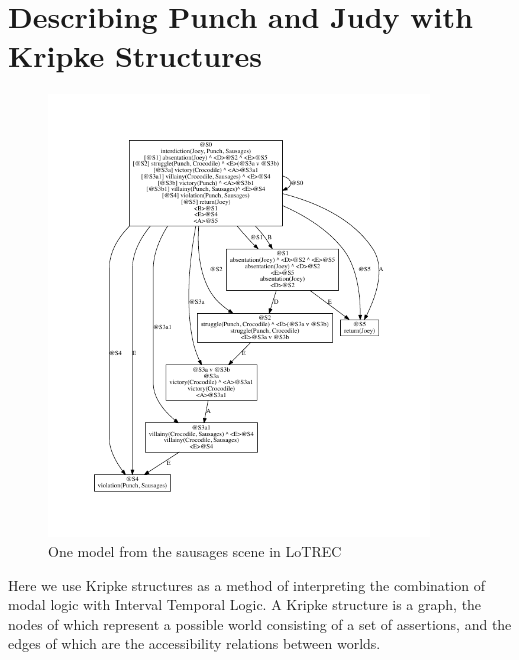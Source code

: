 \documentclass[11pt]{report}
\begin{document}
\section{Describing Punch and Judy with Kripke Structures}\label{sec:kripke}
\begin{figure}[!t]
  \centering
    \centerline{\includegraphics[width=0.9\textwidth]{crocmodel.pdf}}
  \caption{One model from the sausages scene in LoTREC}\label{fig:lotrec}
\end{figure}

Here we use Kripke structures \citep{kripke1963semantical} as a method of interpreting the combination of modal logic with Interval Temporal Logic. A Kripke structure is a graph, the nodes of which represent a possible world consisting of a set of assertions, and the edges of which are the accessibility relations between worlds.
\end{document}
